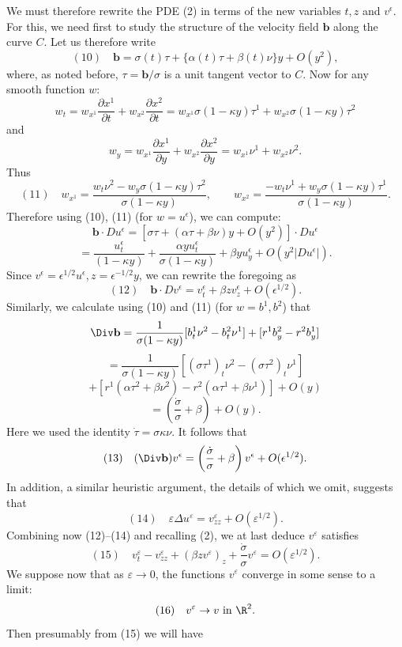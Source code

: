 \begin{example}
We must therefore rewrite the PDE (2) in terms of the new variables $t, z$ and $v^\epsilon$. For this, we need first to study the structure of the velocity field $\mathbf{b}$ along the curve $C$. Let us therefore write
$$(10) \quad \mathbf{b} = \sigma(t)\tau + \{\alpha(t)\tau + \beta(t)\nu\}y + O(y^2),$$
where, as noted before, $\tau = \mathbf{b}/\sigma$ is a unit tangent vector to $C$. Now for any smooth function $w$:
$$w_t = w_{x^1} \frac{\partial x^1}{\partial t} + w_{x^2} \frac{\partial x^2}{\partial t} = w_{x^1}\sigma(1-\kappa y)\tau^1 + w_{x^2}\sigma(1-\kappa y)\tau^2$$
and
$$w_y = w_{x^1} \frac{\partial x^1}{\partial y} + w_{x^2} \frac{\partial x^2}{\partial y} = w_{x^1}\nu^1 + w_{x^2}\nu^2.$$
Thus
$$(11) \quad w_{x^1} = \frac{w_t \nu^2 - w_y \sigma(1-\kappa y)\tau^2}{\sigma(1-\kappa y)}, \qquad w_{x^2} = \frac{-w_t \nu^1 + w_y\sigma(1-\kappa y)\tau^1}{\sigma(1-\kappa y)}.$$
Therefore using (10), (11) (for $w = u^\epsilon$), we can compute:
$$\mathbf{b} \cdot Du^\epsilon = [\sigma\tau + (\alpha\tau + \beta\nu)y + O(y^2)] \cdot Du^\epsilon$$
$$= \frac{u_t^\epsilon}{(1-\kappa y)} + \frac{\alpha y u_t^\epsilon}{\sigma(1-\kappa y)} + \beta y u_y^\epsilon + O(y^2|Du^\epsilon|).$$
Since $v^\epsilon = \epsilon^{1/2}u^\epsilon, z = \epsilon^{-1/2}y$, we can rewrite the foregoing as
$$(12) \quad \mathbf{b} \cdot Dv^\epsilon = v_t^\epsilon + \beta z v_z^\epsilon + O(\epsilon^{1/2}).$$
Similarly, we calculate using (10) and (11) (for $w = b^1, b^2$) that
$$\Div\mathbf{b} = \frac{1}{\sigma(1-\kappa y)}[b_t^1 \nu^2 - b_t^2 \nu^1] + [r^1 b_y^2 - r^2 b_y^1]$$
$$= \frac{1}{\sigma(1-\kappa y)}[(\sigma\tau^1)_t \nu^2 - (\sigma\tau^2)_t \nu^1]$$
$$+ [r^1(\alpha\tau^2 + \beta\nu^2) - r^2(\alpha\tau^1 + \beta\nu^1)] + O(y)$$
$$= \left(\frac{\dot{\sigma}}{\sigma} + \beta\right) + O(y).$$
Here we used the identity $\dot{\tau} = \sigma\kappa\nu$. It follows that
$$(13) \quad (\Div\mathbf{b})v^\epsilon = \left(\frac{\dot{\sigma}}{\sigma} + \beta\right)v^\epsilon + O(\epsilon^{1/2}).$$
In addition, a similar heuristic argument, the details of which we omit, suggests that
$$(14) \quad \varepsilon \Delta u^{\varepsilon} = v_{zz}^{\varepsilon} + O(\varepsilon^{1/2}).$$
Combining now (12)--(14) and recalling (2), we at last deduce $v^{\varepsilon}$ satisfies
$$(15) \quad v_t^{\varepsilon} - v_{zz}^{\varepsilon} + (\beta z v^{\varepsilon})_z + \frac{\dot{\sigma}}{\sigma} v^{\varepsilon} = O(\varepsilon^{1/2}).$$
We suppose now that as $\varepsilon \to 0$, the functions $v^{\varepsilon}$ converge in some sense to a limit:
$$(16) \quad v^{\varepsilon} \to v \text{ in } \R^2.$$
Then presumably from (15) we will have

\end{example}
